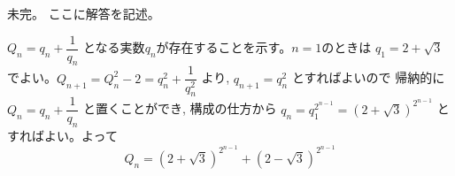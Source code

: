 未完。
ここに解答を記述。

$Q_n=q_n+\dfrac{1}{q_n}$ となる実数$q_n$が存在することを示す。$n=1$のときは $q_1=2+\sqrt{3}$でよい。$Q_{n+1}=Q_n^2-2= q_n^2+\dfrac{1}{q_n^2}$ より, $q_{n+1}=q_n^2$ とすればよいので 帰納的に $Q_n=q_n+\dfrac{1}{q_n}$ と置くことができ, 構成の仕方から $q_n=q_1^{2^{n-1}}=(2+\sqrt{3})^{2^{n-1}}$ とすればよい。よって
\[Q_n= (2+\sqrt{3})^{2^{n-1}}+ (2-\sqrt{3})^{2^{n-1}}\]
